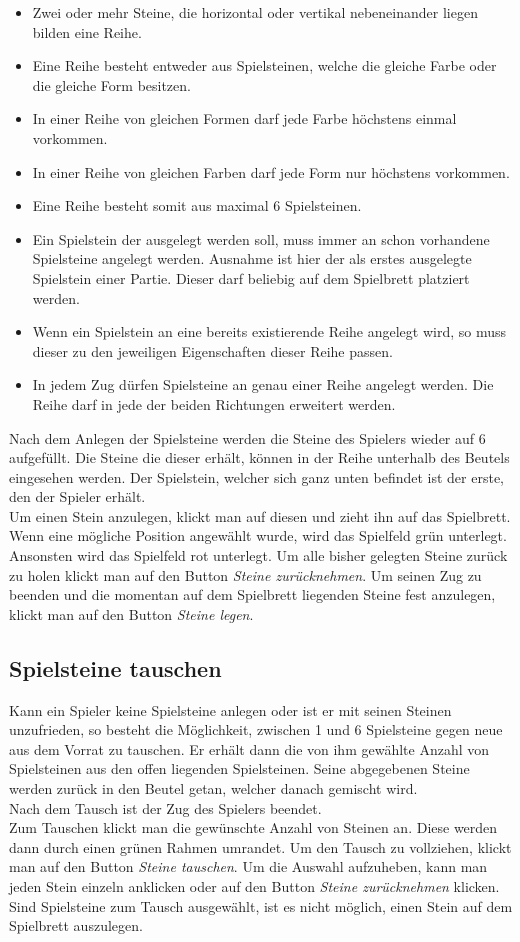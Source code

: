 \documentclass[a4paper, ngerman]{scrartcl}
\begin{document}
\begin{itemize}
\item Zwei oder mehr Steine, die horizontal oder vertikal nebeneinander liegen bilden eine Reihe.
\item Eine Reihe besteht entweder aus Spielsteinen, welche die gleiche Farbe oder die gleiche Form besitzen.
\item In einer Reihe von gleichen Formen darf jede Farbe höchstens einmal vorkommen.
\item In einer Reihe von gleichen Farben darf jede Form nur höchstens vorkommen.
\item Eine Reihe besteht somit aus maximal 6 Spielsteinen.
\item Ein Spielstein der ausgelegt werden soll, muss immer an schon vorhandene Spielsteine angelegt werden. Ausnahme ist hier der als erstes ausgelegte Spielstein einer Partie. Dieser darf beliebig auf dem Spielbrett platziert werden.
\item Wenn ein Spielstein an eine bereits existierende Reihe angelegt wird, so muss dieser zu den jeweiligen Eigenschaften dieser Reihe passen.
\item In jedem Zug dürfen Spielsteine an genau einer Reihe angelegt werden. Die Reihe darf in jede der beiden Richtungen erweitert werden.
\end{itemize}

Nach dem Anlegen der Spielsteine werden die Steine des Spielers wieder auf 6 aufgefüllt. Die Steine die dieser erhält, können in der Reihe unterhalb des Beutels eingesehen werden. Der Spielstein, welcher sich ganz unten befindet ist der erste, den der Spieler erhält.\\
Um einen Stein anzulegen, klickt man auf diesen und zieht ihn auf das Spielbrett. Wenn eine mögliche Position angewählt wurde, wird das Spielfeld grün unterlegt. Ansonsten wird das Spielfeld rot unterlegt. Um alle bisher gelegten Steine zurück zu holen klickt man auf den Button \emph{Steine zurücknehmen}. Um seinen Zug zu beenden und die momentan auf dem Spielbrett liegenden Steine fest anzulegen, klickt man auf den Button \emph{Steine legen}.
	 
\subsection{Spielsteine tauschen}
Kann ein Spieler keine Spielsteine anlegen oder ist er mit seinen Steinen unzufrieden, so besteht die Möglichkeit, zwischen 1 und 6 Spielsteine gegen neue aus dem Vorrat zu tauschen. Er erhält dann die von ihm gewählte Anzahl von Spielsteinen aus den offen liegenden Spielsteinen. Seine abgegebenen Steine werden zurück in den Beutel getan, welcher danach gemischt wird.\\
Nach dem Tausch ist der Zug des Spielers beendet.\\
Zum Tauschen klickt man die gewünschte Anzahl von Steinen an. Diese werden dann durch einen grünen Rahmen umrandet. Um den Tausch zu vollziehen, klickt man auf den Button \emph{Steine tauschen}. Um die Auswahl aufzuheben, kann man jeden Stein einzeln anklicken oder auf den Button \emph{Steine zurücknehmen} klicken. Sind Spielsteine zum Tausch ausgewählt, ist es nicht möglich, einen Stein auf dem Spielbrett auszulegen.
	
\end{document}

